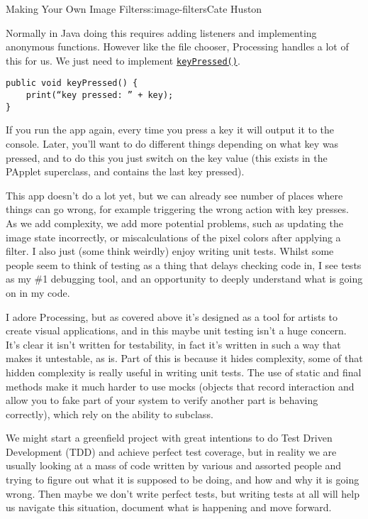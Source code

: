 \begin{aosachapter}{Making Your Own Image Filters}{s:image-filters}{Cate Huston}
\label{responding-to-key-presses}

Normally in Java doing this requires adding listeners and implementing
anonymous functions. However like the file chooser, Processing handles a
lot of this for us. We just need to implement
\href{https://www.processing.org/reference/keyPressed_.html}{\texttt{keyPressed()}}.

\begin{verbatim}
public void keyPressed() {
    print(“key pressed: ” + key);
}
\end{verbatim}

If you run the app again, every time you press a key it will output it
to the console. Later, you'll want to do different things depending on
what key was pressed, and to do this you just switch on the key value
(this exists in the PApplet superclass, and contains the last key
pressed).

\label{writing-tests}

This app doesn't do a lot yet, but we can already see number of places
where things can go wrong, for example triggering the wrong action with
key presses. As we add complexity, we add more potential problems, such
as updating the image state incorrectly, or miscalculations of the pixel
colors after applying a filter. I also just (some think weirdly) enjoy
writing unit tests. Whilst some people seem to think of testing as a
thing that delays checking code in, I see tests as my \#1 debugging
tool, and an opportunity to deeply understand what is going on in my
code.

I adore Processing, but as covered above it's designed as a tool for
artists to create visual applications, and in this maybe unit testing
isn't a huge concern. It's clear it isn't written for testability, in
fact it's written in such a way that makes it untestable, as is. Part of
this is because it hides complexity, some of that hidden complexity is
really useful in writing unit tests. The use of static and final methods
make it much harder to use mocks (objects that record interaction and
allow you to fake part of your system to verify another part is behaving
correctly), which rely on the ability to subclass.

We might start a greenfield project with great intentions to do Test
Driven Development (TDD) and achieve perfect test coverage, but in
reality we are usually looking at a mass of code written by various and
assorted people and trying to figure out what it is supposed to be
doing, and how and why it is going wrong. Then maybe we don't write
perfect tests, but writing tests at all will help us navigate this
situation, document what is happening and move forward.


\end{aosachapter}

